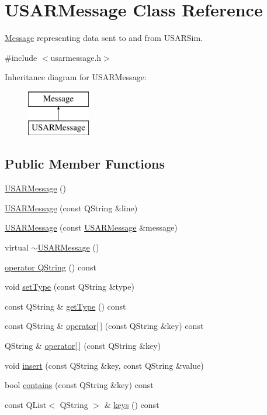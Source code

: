 \hypertarget{classUSARMessage}{
\section{USARMessage Class Reference}
\label{classUSARMessage}
}


\hyperlink{classMessage}{Message} representing data sent to and from USARSim.  




{\ttfamily \#include $<$usarmessage.h$>$}

Inheritance diagram for USARMessage:\begin{figure}[H]
\begin{center}
\leavevmode
\includegraphics[height=2.000000cm]{classUSARMessage}
\end{center}
\end{figure}
\subsection*{Public Member Functions}
\begin{DoxyCompactItemize}
\item 
\hyperlink{classUSARMessage_a9e9a5ff3fa214118795f8ff497d405cd}{USARMessage} ()
\item 
\hyperlink{classUSARMessage_a15feacf7b822e859023b7951104d2c86}{USARMessage} (const QString \&line)
\item 
\hyperlink{classUSARMessage_a773cca2f8b7144ee91607f9a06de8b87}{USARMessage} (const \hyperlink{classUSARMessage}{USARMessage} \&message)
\item 
virtual \hyperlink{classUSARMessage_ae1b97a8729759a96269a7a6094dc16d1}{$\sim$USARMessage} ()
\item 
\hyperlink{classUSARMessage_a37cb1728fb9fba59a8d46376ef4ff06f}{operator QString} () const 
\item 
void \hyperlink{classUSARMessage_a758f2f40962494e9d7849b3f9a480599}{setType} (const QString \&type)
\item 
const QString \& \hyperlink{classUSARMessage_ab71d4e8b5cd81b7b6567936fb4614aaf}{getType} () const 
\item 
const QString \& \hyperlink{classUSARMessage_a75f24312fd0d5ae95c2439d31e11d9f1}{operator\mbox{[}$\,$\mbox{]}} (const QString \&key) const 
\item 
QString \& \hyperlink{classUSARMessage_af7df32828ebbac479f34d769575e4ea1}{operator\mbox{[}$\,$\mbox{]}} (const QString \&key)
\item 
void \hyperlink{classUSARMessage_af98c3d21afaba3456bd8eab56d92de1a}{insert} (const QString \&key, const QString \&value)
\item 
bool \hyperlink{classUSARMessage_aa86ec4c02f60f20d65db97c062c601b2}{contains} (const QString \&key) const 
\item 
const QList$<$ QString $>$ \& \hyperlink{classUSARMessage_a449ec98406459bad6ed7fc0e58e105f8}{keys} () const 
\end{DoxyCompactItemize}


